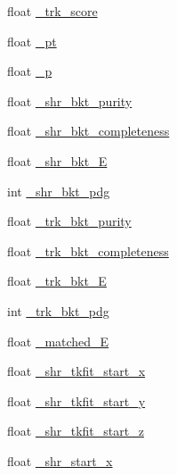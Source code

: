 \begin{DoxyCompactItemize}
float \hyperlink{classselection_1_1CC0piNpSelection_a72517a224dc19f95faef3efde9a999d1}{\-\_\-trk\-\_\-score}
\item 
float \hyperlink{classselection_1_1CC0piNpSelection_a98281b58b33ff8c03fa9b00f3f3baa06}{\-\_\-pt}
\item 
float \hyperlink{classselection_1_1CC0piNpSelection_afae64b232d6b3526032b289c91b092cb}{\-\_\-p}
\item 
float \hyperlink{classselection_1_1CC0piNpSelection_a1da68886d5b7a5b4eb1785649c48e8ef}{\-\_\-shr\-\_\-bkt\-\_\-purity}
\item 
float \hyperlink{classselection_1_1CC0piNpSelection_ac3c3c9895ca501c3b73f14addfddf495}{\-\_\-shr\-\_\-bkt\-\_\-completeness}
\item 
float \hyperlink{classselection_1_1CC0piNpSelection_aa1a21f48d99a4de5f1d444aa3d64dedf}{\-\_\-shr\-\_\-bkt\-\_\-\-E}
\item 
int \hyperlink{classselection_1_1CC0piNpSelection_aab09f93d7cd57031de714956414f3230}{\-\_\-shr\-\_\-bkt\-\_\-pdg}
\item 
float \hyperlink{classselection_1_1CC0piNpSelection_a39a84b873306f200a2350b4804429791}{\-\_\-trk\-\_\-bkt\-\_\-purity}
\item 
float \hyperlink{classselection_1_1CC0piNpSelection_aab22ce289e2d4a109440369e30fddf52}{\-\_\-trk\-\_\-bkt\-\_\-completeness}
\item 
float \hyperlink{classselection_1_1CC0piNpSelection_aa7a6076f1169185e0b2b02fbb03aba22}{\-\_\-trk\-\_\-bkt\-\_\-\-E}
\item 
int \hyperlink{classselection_1_1CC0piNpSelection_a7044de37ee4f3615ffe4bb15e9f00f8e}{\-\_\-trk\-\_\-bkt\-\_\-pdg}
\item 
float \hyperlink{classselection_1_1CC0piNpSelection_ac75aa3ac33061bbdd378594ee7e6e2e5}{\-\_\-matched\-\_\-\-E}
\item 
float \hyperlink{classselection_1_1CC0piNpSelection_a44002e3cc4d16dce6e6f61ee3a2bae6a}{\-\_\-shr\-\_\-tkfit\-\_\-start\-\_\-x}
\item 
float \hyperlink{classselection_1_1CC0piNpSelection_acd1826c44855b71bce92253f7ac1a758}{\-\_\-shr\-\_\-tkfit\-\_\-start\-\_\-y}
\item 
float \hyperlink{classselection_1_1CC0piNpSelection_a4d3591a8bb7abd9e320f35ca3bf311c2}{\-\_\-shr\-\_\-tkfit\-\_\-start\-\_\-z}
\item 
float \hyperlink{classselection_1_1CC0piNpSelection_ac0fb4dbd656f2f3fb2c12ffc02a0df7c}{\-\_\-shr\-\_\-start\-\_\-x}
\item 

\end{DoxyCompactItemize}
